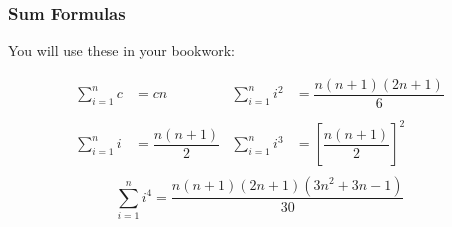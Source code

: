 \documentclass{beamer}
\begin{document}
 
	 
 
%	
 

 
  
 

\begin{frame}[plain]
 \frametitle{Sum Formulas} 
 
 \begin{block}{You will use these in your bookwork:}

	\begin{align*}
 		\sum_{i=1}^{n}c &=cn &\sum_{i=1}^{n}i^2&=\dfrac{n(n+1)(2n+1)}{6}\\
		 \\
		\sum_{i=1}^{n}i &=\dfrac{n(n+1)}{2}	& \sum_{i=1}^{n}i^3&=\left[\dfrac{n(n+1)}{2}\right]^2\\
	\end{align*}
 	\[ \sum_{i=1}^{n}i^4=\dfrac{n(n+1)(2n+1)(3n^2+3n-1)}{30}\] 
\end{block}
 
\end{frame}
\end{document}
